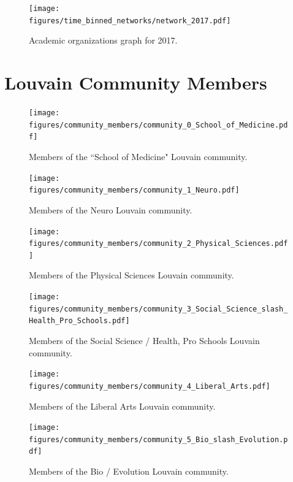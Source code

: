 \documentclass[notitlepage,aps,prd,nofootinbib]{revtex4-1}
\newcommand{\figures}{../outputs/plots}
\begin{document}
\begin{appendices}
\begin{figure}[!htb]\centering
  \texttt{[image: \\figures/time\_binned\_networks/network\_2017.pdf]}
  \caption{Academic organizations graph for 2017.}
\end{figure}


\section{Louvain Community Members}
\label{appendix:community_members}

\begin{figure}[!htb]\centering
  \texttt{[image: \\figures/community\_members/community\_0\_School\_of\_Medicine.pdf]}
  \caption{Members of the ``School of Medicine" Louvain community.}
\end{figure}

\begin{figure}[!htb]\centering
  \texttt{[image: \\figures/community\_members/community\_1\_Neuro.pdf]}
  \caption{Members of the Neuro Louvain community.}
\end{figure}

\begin{figure}[!htb]\centering
  \texttt{[image: \\figures/community\_members/community\_2\_Physical\_Sciences.pdf]}
  \caption{Members of the Physical Sciences Louvain community.}
  \label{fig:f_community_physical_sciences}
\end{figure}

\begin{figure}[!htb]\centering
  \texttt{[image: \\figures/community\_members/community\_3\_Social\_Science\_slash\_Health\_Pro\_Schools.pdf]}
  \caption{Members of the Social Science / Health, Pro Schools Louvain community.}
\end{figure}

\begin{figure}[!htb]\centering
  \texttt{[image: \\figures/community\_members/community\_4\_Liberal\_Arts.pdf]}
  \caption{Members of the Liberal Arts Louvain community.}
\end{figure}

\begin{figure}[!htb]\centering
  \texttt{[image: \\figures/community\_members/community\_5\_Bio\_slash\_Evolution.pdf]}
  \caption{Members of the Bio / Evolution Louvain community.}
\end{figure}



\end{appendices}
\end{document}
